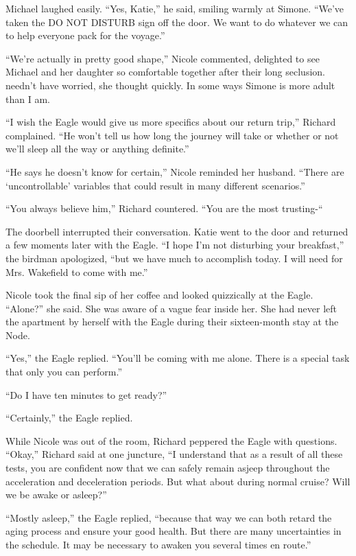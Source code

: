 \documentclass[]{article}
\begin{document}
{Michael laughed easily.  “Yes, Katie,” he said, smiling warmly at Simone.  “We’ve taken the DO NOT DISTURB sign off the door.  We want to do whatever we can to help everyone pack for the voyage.”

“We’re actually in pretty good shape,” Nicole commented, delighted to see Michael and her daughter so comfortable together after their long seclusion.  needn’t have worried, she thought quickly.  In some ways Simone is more adult than I am.

“I wish the Eagle would give us more specifics about our return trip,” Richard complained.  “He won’t tell us how long the journey will take or whether or not we’ll sleep all the way or anything definite.”

“He says he doesn’t know for certain,” Nicole reminded her husband.  “There are ‘uncontrollable’ variables that could result in many different scenarios.”

“You always believe him,” Richard countered.  “You are the most trusting-“

The doorbell interrupted their conversation.  Katie went to the door and returned a few moments later with the Eagle.  “I hope I’m not disturbing your breakfast,” the birdman apologized, “but we have much to accomplish today.  I will need for Mrs.  Wakefield to come with me.”

Nicole took the final sip of her coffee and looked quizzically at the Eagle.  “Alone?” she said.  She was aware of a vague fear inside her.  She had never left the apartment by herself with the Eagle during their sixteen-month stay at the Node.

“Yes,” the Eagle replied.  “You’ll be coming with me alone.  There is a special task that only you can perform.”

“Do I have ten minutes to get ready?”

“Certainly,” the Eagle replied.

While Nicole was out of the room, Richard peppered the Eagle with questions.  “Okay,” Richard said at one juncture, “I understand that as a result of all these tests, you are confident now that we can safely remain asjeep throughout the acceleration and deceleration periods.  But what about during normal cruise? Will we be awake or asleep?”

“Mostly asleep,” the Eagle replied, “because that way we can both retard the aging process and ensure your good health.  But there are many uncertainties in the schedule.  It may be necessary to awaken you several times en route.”

}
\end{document}
